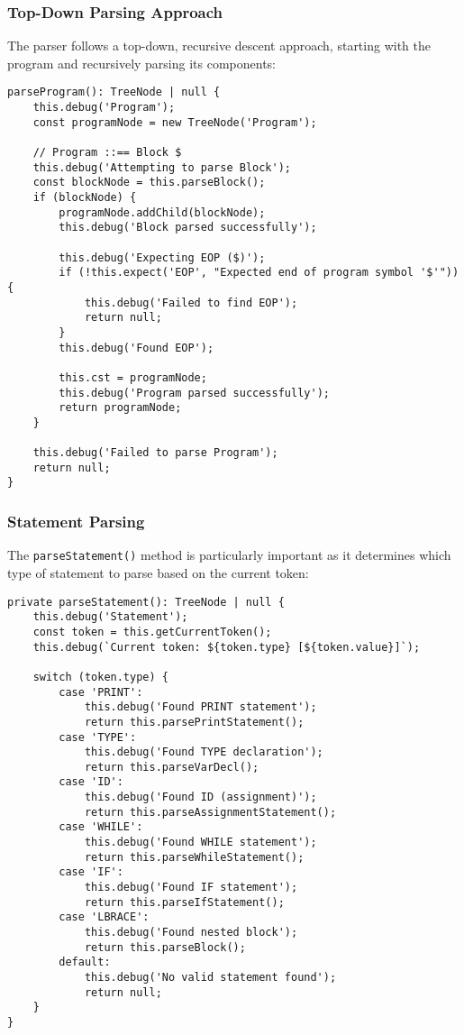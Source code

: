 \documentclass[12pt]{article}
\begin{document}
\subsubsection{Top-Down Parsing Approach}
The parser follows a top-down, recursive descent approach, starting with the program and recursively parsing its components:

\begin{lstlisting}
parseProgram(): TreeNode | null {
    this.debug('Program');
    const programNode = new TreeNode('Program');
    
    // Program ::== Block $
    this.debug('Attempting to parse Block');
    const blockNode = this.parseBlock();
    if (blockNode) {
        programNode.addChild(blockNode);
        this.debug('Block parsed successfully');
        
        this.debug('Expecting EOP ($)');
        if (!this.expect('EOP', "Expected end of program symbol '$'")) {
            this.debug('Failed to find EOP');
            return null;
        }
        this.debug('Found EOP');
        
        this.cst = programNode;
        this.debug('Program parsed successfully');
        return programNode;
    }
    
    this.debug('Failed to parse Program');
    return null;
}
\end{lstlisting}

\subsubsection{Statement Parsing}
The \texttt{parseStatement()} method is particularly important as it determines which type of statement to parse based on the current token:

\begin{lstlisting}
private parseStatement(): TreeNode | null {
    this.debug('Statement');
    const token = this.getCurrentToken();
    this.debug(`Current token: ${token.type} [${token.value}]`);
    
    switch (token.type) {
        case 'PRINT':
            this.debug('Found PRINT statement');
            return this.parsePrintStatement();
        case 'TYPE':
            this.debug('Found TYPE declaration');
            return this.parseVarDecl();
        case 'ID':
            this.debug('Found ID (assignment)');
            return this.parseAssignmentStatement();
        case 'WHILE':
            this.debug('Found WHILE statement');
            return this.parseWhileStatement();
        case 'IF':
            this.debug('Found IF statement');
            return this.parseIfStatement();
        case 'LBRACE':
            this.debug('Found nested block');
            return this.parseBlock();
        default:
            this.debug('No valid statement found');
            return null;
    }
}
\end{lstlisting}
\end{document}
